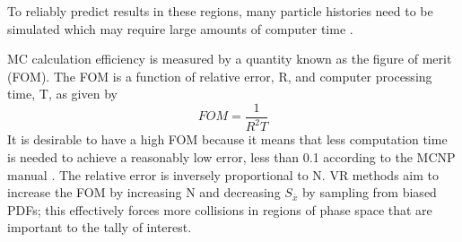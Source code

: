 To reliably predict results in these regions, many particle
histories need to be simulated which may require large amounts of computer time
\cite{haghighat_wagner_2003}.

MC calculation efficiency is measured by a quantity known as the figure of merit
(FOM).  The FOM is a function of relative error, R, and computer processing
time, T, 
as given by
\begin{equation} \label{eq:1.3}
		FOM = \frac{1}{{{R^2}T}}
\end{equation}
It is desirable to have a high FOM because it means that less computation time is needed to achieve
a reasonably low error, less than 0.1 according to the MCNP manual
\cite{mcnp_manual}. 
The relative error is inversely proportional to N.
VR methods
aim to increase the FOM by increasing N and decreasing $S_{\overline{x}}$ by sampling from biased PDFs; this effectively
forces more collisions in regions of phase space that are
important to the tally of interest. 
